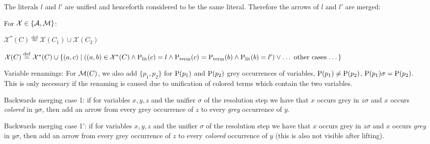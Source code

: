 \documentclass[,%
	paper=a4,%
	DIV14, %
	twoside=false,%
	liststotoc,
	bibtotoc,
	draft=false,%
	numbers=noendperiod
]{scrartcl}
\begin{document}
\begin{enumerate}
		The literals $l$ and $l'$ are unified and henceforth considered to be the same literal.
		Therefore the arrows of $l$ and $l'$ are merged:

		For $\mathcal{X} \in \{\operatorname{\mathcal{A}}, \operatorname{\operatorname{\mathcal{M}}}\}$:

		$\mathcal{X}^*(C) \stackrel{\operatorname{def}}{=} \mathcal{X}(C_1) \cup \mathcal{X}(C_2)$

		$\mathcal{X}(C) \stackrel{\operatorname{def}}{=} \mathcal{X}^*(C) \cup \{(a,c) \mid ((a,b)\in\mathcal{X}^*(C) \land \operatorname{\operatorname{{\operatorname P}}_\mathrm{lit}}(c) = l \land \operatorname{\operatorname{{\operatorname P}}_\mathrm{term}}(c) = \operatorname{\operatorname{{\operatorname P}}_\mathrm{term}}(b) \land \operatorname{\operatorname{{\operatorname P}}_\mathrm{lit}}(b) = l') \lor \text{\dots~other cases \dots}\}$

		Variable renamings: For $\operatorname{\mathcal{M}}(C)$, we also add $\{p_1, p_2\}$
		for
		$\operatorname{{\operatorname P}}(p_1)$ and $\operatorname{{\operatorname P}}(p_2)$ grey occurrences of variables,
		$\pos(p_1) \neq\nolinebreak \pos(p_2)$,
		$\operatorname{{\operatorname P}}(p_1) \sigma = \operatorname{{\operatorname P}}(p_2)$.
		This is only necessary if the renaming is caused due to unification of colored terms which contain the two variables.




		Backwards merging case 1: if for variables $x,y,z$
		and the unifier $\sigma$ of the resolution step we have that $x$ occurs grey in $z\sigma$ and $x$ occurs \emph{colored} in $y\sigma$, then add an arrow from every grey occurrence of $z$ to every \emph{grey} occurrence of $y$.

		Backwards merging case 1': if for variables $x,y,z$
		and the unifier $\sigma$ of the resolution step we have that $x$ occurs grey in $z\sigma$ and $x$ occurs \emph{grey} in $y\sigma$, then add an arrow from every grey occurrence of $z$ to every \emph{colored} occurrence of $y$ (this is also not visible after lifting).


\end{enumerate}
\end{document}
